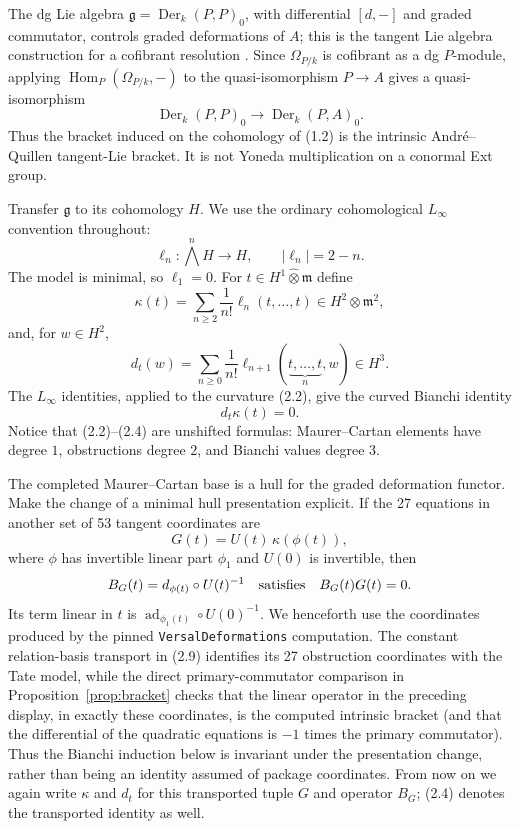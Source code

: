 \documentclass[11pt]{article}
\theoremstyle{definition}
\theoremstyle{remark}
\newcommand{\Der}{\operatorname{Der}}
\newcommand{\ad}{\operatorname{ad}}
\begin{document}
The dg Lie algebra $\mathfrak g=\Der_k(P,P)_0$, with differential
$[d,-]$ and graded commutator, controls graded deformations of $A$; this is the
tangent Lie algebra construction for a cofibrant resolution
\cite{Hinich97,Hinich04}.  Since $\Omega_{P/k}$ is cofibrant as a dg
$P$-module, applying $\operatorname{Hom}_P(\Omega_{P/k},-)$ to the
quasi-isomorphism $P\to A$ gives a quasi-isomorphism
\[
 \Der_k(P,P)_0\longrightarrow\Der_k(P,A)_0.                    \tag{2.1}
\]
Thus the bracket induced on the cohomology of (1.2) is the intrinsic
Andr\'e--Quillen tangent-Lie bracket.  It is not Yoneda multiplication on a
conormal Ext group.

Transfer $\mathfrak g$ to its cohomology $H$.  We use the ordinary
cohomological $L_\infty$ convention throughout:
\[
 \ell_n:\bigwedge^n H\longrightarrow H,\qquad |\ell_n|=2-n.
\]
The model is minimal, so $\ell_1=0$.  For $t\in H^1\widehat\otimes\mathfrak m$
define
\[
 \kappa(t)=\sum_{n\ge2}\frac1{n!}\ell_n(t,\ldots,t)\in
 H^2\widehat\otimes\mathfrak m^2,                              \tag{2.2}
\]
and, for $w\in H^2$,
\[
 d_t(w)=\sum_{n\ge0}\frac1{n!}
 \ell_{n+1}(\underbrace{t,\ldots,t}_{n},w)\in H^3.             \tag{2.3}
\]
The $L_\infty$ identities, applied to the curvature (2.2), give the curved
Bianchi identity
\[
 d_t\kappa(t)=0.                                                \tag{2.4}
\]
Notice that (2.2)--(2.4) are unshifted formulas: Maurer--Cartan elements have
degree $1$, obstructions degree $2$, and Bianchi values degree $3$.

The completed Maurer--Cartan base is a hull for the graded deformation
functor.  Make the change of a minimal hull presentation explicit.  If the
27 equations in another set of 53 tangent coordinates are
\[
 G(t)=U(t)\,\kappa(\phi(t)),
\]
where $\phi$ has invertible linear part $\phi_1$ and $U(0)$ is invertible,
then
\[
 B_G(t)=d_{\phi(t)}\circ U(t)^{-1}
 \quad\hbox{satisfies}\quad B_G(t)G(t)=0.
\]
Its term linear in $t$ is
$\ad_{\phi_1(t)}\circ U(0)^{-1}$.  We henceforth use the coordinates
produced by the pinned \texttt{VersalDeformations} computation.  The
constant relation-basis transport in (2.9) identifies its 27 obstruction
coordinates with the Tate model, while the direct primary-commutator
comparison in Proposition~\ref{prop:bracket} checks that the linear operator
in the preceding display, in exactly these coordinates, is the computed
intrinsic bracket
(and that the differential of the quadratic equations is $-1$ times the
primary commutator).  Thus the Bianchi induction below is invariant under
the presentation change, rather than being an identity assumed of package
coordinates.  From now on we again write $\kappa$ and $d_t$ for this
transported tuple $G$ and operator $B_G$; (2.4) denotes the transported
identity as well.
\end{document}
